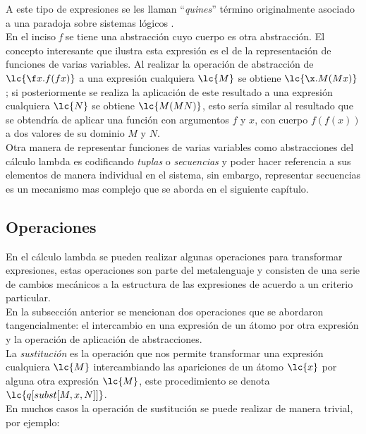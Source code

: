 A este tipo de expresiones se les llaman ``\emph{quines}'' \cite{Hofstadter:GEB}
término originalmente asociado a una paradoja sobre sistemas lógicos
\cite{Quine:Paradox}. \\

En el inciso \emph{f} se tiene una abstracción cuyo cuerpo es otra abstracción.
El concepto interesante que ilustra esta expresión es el de la representación de
funciones de varias variables. Al realizar la operación de abstracción de
\(\lc{\f x.f(f x)}\) a una expresión cualquiera \(\lc{M}\) se obtiene
\(\lc{\x.M(M x)}\); si posteriormente se realiza la aplicación de este resultado
a una expresión cualquiera \(\lc{N}\) se obtiene \(\lc{M(M N)}\), esto sería
similar al resultado que se obtendría de aplicar una función con argumentos
\(f\) y \(x\), con cuerpo \(f(f(x))\) a dos valores de su dominio \(M\) y \(N\).
\\

Otra manera de representar funciones de varias variables como abstracciones del
cálculo lambda es codificando \emph{tuplas} o \emph{secuencias} y poder hacer
referencia a sus elementos de manera individual en el sistema, sin embargo,
representar secuencias es un mecanismo mas complejo que se aborda en el
siguiente capítulo. \\

\subsection{Operaciones}

En el cálculo lambda se pueden realizar algunas operaciones para transformar
expresiones, estas operaciones son parte del metalenguaje y consisten de una
serie de cambios mecánicos a la estructura de las expresiones de acuerdo a un
criterio particular. \\

En la subsección anterior se mencionan dos operaciones que se abordaron
tangencialmente: el intercambio en una expresión de un átomo por otra expresión
y la operación de aplicación de abstracciones. \\

La \emph{sustitución} es la operación que nos permite transformar una expresión
cualquiera \(\lc{M}\) intercambiando las apariciones de un átomo \(\lc{x}\) por alguna
otra expresión \(\lc{M}\), este procedimiento se denota
\(\lc{q[subst[M,x,N]]}\). \\

En muchos casos la operación de sustitución se puede realizar de manera trivial,
por ejemplo:

